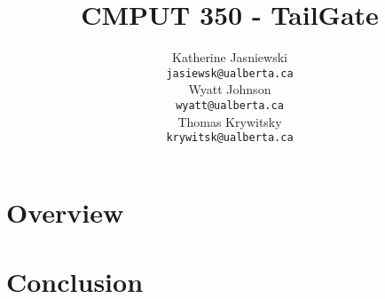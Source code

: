 \documentclass{article}
\title{CMPUT 350 - TailGate} %
\author{
		Katherine Jasniewski\\
		\texttt{jasiewsk@ualberta.ca} \\
	\AND
		Wyatt Johnson\\
		\texttt{wyatt@ualberta.ca} \\
	\AND
		Thomas Krywitsky\\
		\texttt{krywitsk@ualberta.ca} \\
}
\begin{document}
\maketitle

\begin{abstract}
\end{abstract}


\section{Overview}




\section{Conclusion}


{}

\end{document}
